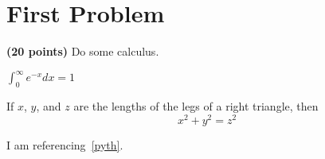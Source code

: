 \section{First Problem}

{\bf (20 points)}
Do some calculus.

\begin{solution}
  $\displaystyle \int_0^\infty e^{-x} dx = 1$
  \begin{theorem}
    \label{pyth}
    If $x$, $y$, and $z$ are the lengths of the legs of a right triangle, then
    \[
      x^2 + y^2 = z^2
    \]
  \end{theorem}

  I am referencing~\ref{pyth}.
\end{solution}
